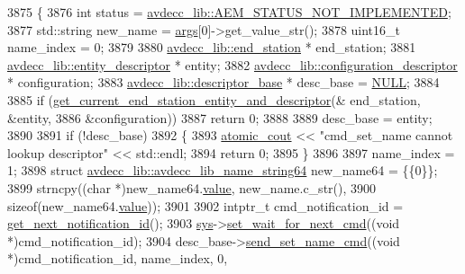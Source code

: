 \begin{DoxyCode}
3875 \{
3876     \textcolor{keywordtype}{int} status = \hyperlink{namespaceavdecc__lib_affd436edb2cecd20cfd784a84f852b2ba1de0a38d458af43bc8965b715fd37b4f}{avdecc\_lib::AEM\_STATUS\_NOT\_IMPLEMENTED};
3877     std::string new\_name = \hyperlink{namespaceastime__fitline_a8187411843a6284ffb964ef3fb9fcab3}{args}[0]->get\_value\_str();
3878     uint16\_t name\_index = 0;
3879 
3880     \hyperlink{classavdecc__lib_1_1end__station}{avdecc\_lib::end\_station} * end\_station;
3881     \hyperlink{classavdecc__lib_1_1entity__descriptor}{avdecc\_lib::entity\_descriptor} * entity;
3882     \hyperlink{classavdecc__lib_1_1configuration__descriptor}{avdecc\_lib::configuration\_descriptor} * configuration;
3883     \hyperlink{classavdecc__lib_1_1descriptor__base}{avdecc\_lib::descriptor\_base} * desc\_base = \hyperlink{openavb__types__base__pub_8h_a070d2ce7b6bb7e5c05602aa8c308d0c4}{NULL};
3884 
3885     \textcolor{keywordflow}{if} (\hyperlink{classcmd__line_ac2d4611fba7db03d436a2e3c1e64828e}{get\_current\_end\_station\_entity\_and\_descriptor}(&
      end\_station, &entity,
3886                                                       &configuration))
3887         \textcolor{keywordflow}{return} 0;
3888 
3889     desc\_base = entity;
3890 
3891     \textcolor{keywordflow}{if} (!desc\_base)
3892     \{
3893         \hyperlink{cmd__line_8h_a0bc38ccc65c79ba06c6fcd7b4bf554c3}{atomic\_cout} << \textcolor{stringliteral}{"cmd\_set\_name cannot lookup descriptor"} << std::endl;
3894         \textcolor{keywordflow}{return} 0;
3895     \}
3896 
3897     name\_index = 1;
3898     \textcolor{keyword}{struct }\hyperlink{structavdecc__lib_1_1avdecc__lib__name__string64}{avdecc\_lib::avdecc\_lib\_name\_string64} new\_name64 = \{\{0\}\};
3899     strncpy((\textcolor{keywordtype}{char} *)new\_name64.\hyperlink{structavdecc__lib_1_1avdecc__lib__name__string64_a7968db9d35aabae83b5c038723160e28}{value}, new\_name.c\_str(),
3900             \textcolor{keyword}{sizeof}(new\_name64.\hyperlink{structavdecc__lib_1_1avdecc__lib__name__string64_a7968db9d35aabae83b5c038723160e28}{value}));
3901 
3902     intptr\_t cmd\_notification\_id = \hyperlink{classcmd__line_a57486218387d1aa9d262eb7c176154ad}{get\_next\_notification\_id}();
3903     \hyperlink{classcmd__line_a485db4800e331cb4052c447fdf5d154e}{sys}->\hyperlink{classavdecc__lib_1_1system_a26b769584f10225077da47583edda33e}{set\_wait\_for\_next\_cmd}((\textcolor{keywordtype}{void} *)cmd\_notification\_id);
3904     desc\_base->\hyperlink{classavdecc__lib_1_1descriptor__base_a6a8c227d7a202f251c689107df7ede0b}{send\_set\_name\_cmd}((\textcolor{keywordtype}{void} *)cmd\_notification\_id, name\_index, 0,

\end{DoxyCode}
